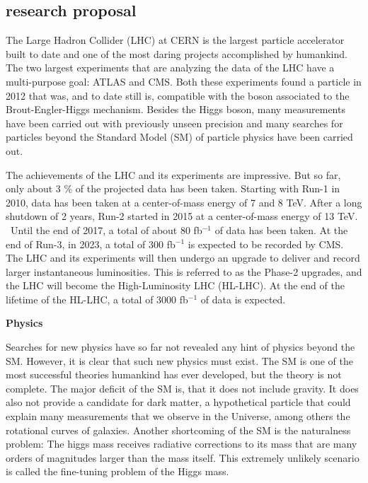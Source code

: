 \documentclass[]{cv} %
\begin{document}
\ifstatement
\begin{statement}

\section{research proposal}

The Large Hadron Collider (LHC) at CERN is the largest particle accelerator
built to date and one of the most daring projects accomplished by humankind. The
two largest experiments that are analyzing the data of the LHC have a
multi-purpose goal: ATLAS and CMS. Both these experiments found a particle in
2012 that was, and to date still is, compatible with the boson associated to the
Brout-Engler-Higgs mechanism. Besides the Higgs boson, many measurements have
been carried out with previously unseen precision and many searches for
particles beyond the Standard Model (SM) of particle physics have been carried
out.

The achievements of the LHC and its experiments are impressive. But so far, only
about 3 \% of the projected data has been taken. Starting with Run-1 in 2010,
data has been taken at a center-of-mass energy of 7 and 8 TeV. After a long
shutdown of 2 years, Run-2 started in 2015 at a center-of-mass energy of 13 TeV.
 Until the end of 2017, a total of about 80 fb$^{-1}$ of data has been taken. At
the end of Run-3, in 2023, a total of 300 fb$^{-1}$ is expected to be recorded
by CMS.  The LHC and its experiments will then undergo an upgrade to deliver and
record larger instantaneous luminosities. This is referred to as the Phase-2
upgrades, and the LHC will become the High-Luminosity LHC (HL-LHC). At the end
of the lifetime of the HL-LHC, a total of 3000 fb$^{-1}$ of data is expected.

\vspace{15pt}
\Large{}
\textbf{Physics}
\normalsize{}

Searches for new physics have so far not revealed any hint of physics beyond the
SM. However, it is clear that such new physics must exist. The SM is one of the
most successful theories humankind has ever developed, but the theory is not
complete. The major deficit of the SM is, that it does not include gravity. It
does also not provide a candidate for dark matter, a hypothetical particle that
could explain many measurements that we observe in the Universe, among others
the rotational curves of galaxies. Another shortcoming of the SM is the
naturalness problem: The higgs mass receives radiative corrections to its mass
that are many orders of magnitudes larger than the mass itself. This extremely
unlikely scenario is called the fine-tuning problem of the Higgs mass.


\end{statement}
\end{document}
